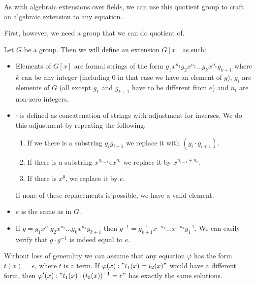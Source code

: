 As with algebraic extensions over fields, we can use this quotient group to craft an algebraic extension to any equation.

First, however, we need a group that we can do quotient of.

\begin{defn}
\label{freegroupdefn}
	Let $G$ be a group. Then we will define an extension $G[x]$ as such:
	\begin{itemize}
		\item Elements of $G[x]$ are formal strings of the form $g_1 x^{n_1}g_2 x^{n_2}\dots g_k x^{n_k}g_{k+1}$ where $k$ can be any integer (including $0$-in that case we have an element of $g$), $g_i$ are elements of $G$ (all except $g_1$ and $g_{k+1}$ have to be different from $e$) and $n_i$ are non-zero integers.
		\item $\cdot$ is defined as concatenation of strings with adjustment for inverses. We do this adjustment by repeating the following:
			\begin{enumerate}
				\item If we there is a substring $g_i g_{i+1}$ we replace it with $(g_i\cdot g_{i+1})$.
				\item If there is a substring $x^{n_{i-1}}ex^{n_i}$ we replace it by $x^{n_{i-1}+n_i}$.
				\item If there is $x^0$, we replace it by $e$.			
			\end{enumerate}
			If none of these replacements is possible, we have a valid element.
	\item $e$ is the same as in $G$.
	\item If  $g=g_1 x^{n_1}g_2 x^{n_2}\dots g_k x^{n_k}g_{k+1}$ then $g^{-1}=g_{k+1}^{-1}x^{-n_k}\dots x^{-n_1}g_1^{-1}$. We can easily verify that $g\cdot g^{-1}$ is indeed equal to $e$.
	\end{itemize}
\end{defn}

Without loss of generality we can assume that any equation $\varphi$ has the form $t(x)=e$, where $t$ is a term. If $\varphi(x): "t_1(x)=t_2(x)"$ would have a different form, then $\varphi'(x): "t_1(x)\cdot (t_2(x))^{-1}=e"$ has exactly the same solutions.

